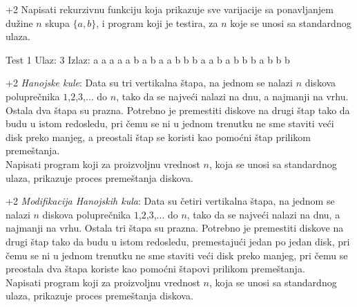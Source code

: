 \begin{Exercise}[label=116]\marker+{2}
Napisati rekurzivnu funkciju koja prikazuje sve varijacije sa
   ponavljanjem dužine $n$ skupa $\{a, b\}$, i program koji je
   testira, za $n$ koje se unosi sa standardnog ulaza.

\begin{miditest}
\begin{test}{Test 1}
Ulaz:    3
Izlaz:   a a a
         a a b
         a b a
         a b b
         b a a
         b a b
         b b a
         b b b
\end{test}
\end{miditest}
\end{Exercise}

\begin{Exercise}[label=117]\marker+{2}
{\em Hanojske kule}: Data su tri
  vertikalna štapa, na jednom se nalazi $n$ diskova poluprečnika
  $1$,$2$,$3$,... do $n$, tako da se najveći nalazi na dnu, a
  najmanji na vrhu. Ostala dva štapa su prazna. Potrebno je
  premestiti diskove na drugi štap tako da budu u istom redosledu, pri čemu se ni u jednom
  trenutku ne sme staviti veći disk preko manjeg, a preostali štap se koristi kao pomoćni štap prilikom
  premeštanja. \\
  Napisati program koji za proizvoljnu vrednost $n$, koja se unosi sa standardnog ulaza, prikazuje proces premeštanja diskova.

\end{Exercise}

\begin{Exercise}[label=118]\marker+{2}
{\em Modifikacija Hanojskih kula}: Data su četiri
  vertikalna štapa, na jednom se nalazi $n$ diskova poluprečnika
  $1$,$2$,$3$,... do $n$, tako da se najveći nalazi na dnu, a
  najmanji na vrhu. Ostala tri štapa su prazna. Potrebno je
  premestiti diskove na drugi štap tako da budu u istom redosledu,
  premestajući jedan po jedan disk, pri čemu se ni u jednom
  trenutku ne sme staviti veći disk preko manjeg, pri čemu se
  preostala dva štapa koriste kao pomoćni štapovi prilikom
  premeštanja.\\
  Napisati program koji za proizvoljnu vrednost $n$, koja se unosi sa standardnog ulaza, prikazuje proces premeštanja diskova.

\end{Exercise}

